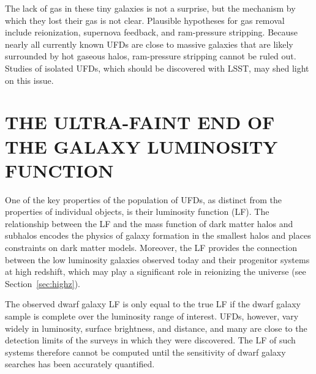 \documentclass[a4paper]{ar-1col}
\begin{document}
The lack of gas in these tiny galaxies is not a surprise, but the
mechanism by which they lost their gas is not clear.  Plausible
hypotheses for gas removal include reionization, supernova feedback,
and ram-pressure stripping.  Because nearly all currently known UFDs
are close to massive galaxies that are likely surrounded by hot
gaseous halos, ram-pressure stripping cannot be ruled out.  Studies of
isolated UFDs, which should be discovered with LSST, may shed light on
this issue.


\section{THE ULTRA-FAINT END OF THE GALAXY LUMINOSITY FUNCTION}
\label{sec:lf}

One of the key properties of the population of UFDs, as distinct from
the properties of individual objects, is their luminosity function
(LF).  The relationship between the LF and the mass function of dark
matter halos and subhalos encodes the physics of galaxy formation in
the smallest halos and places constraints on dark matter models.
Moreover, the LF provides the connection between the low luminosity
galaxies observed today and their progenitor systems at high redshift,
which may play a significant role in reionizing the universe (see
Section~\ref{sec:highz}).

The observed dwarf galaxy LF is only equal to the true LF if the dwarf
galaxy sample is complete over the luminosity range of interest.
UFDs, however, vary widely in luminosity, surface brightness, and
distance, and many are close to the detection limits of the surveys in
which they were discovered.  The LF of such systems therefore cannot
be computed until the sensitivity of dwarf galaxy searches has been
accurately quantified.
\end{document}
